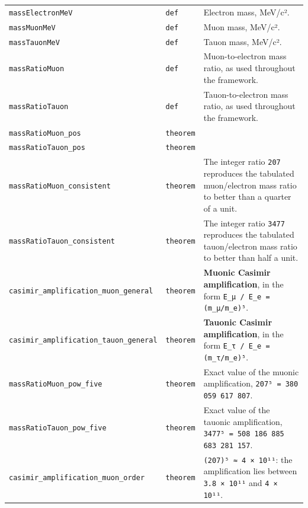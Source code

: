 \documentclass[11pt,a4paper]{article}
\begin{document}
\begin{center}
\begin{longtable}{@{}p{}p{}p{}@{}}
\texttt{massElectronMeV} & \texttt{def} & \small Electron mass, MeV/c². \\
\texttt{massMuonMeV} & \texttt{def} & \small Muon mass, MeV/c². \\
\texttt{massTauonMeV} & \texttt{def} & \small Tauon mass, MeV/c². \\
\texttt{massRatioMuon} & \texttt{def} & \small Muon-to-electron mass ratio, as used throughout the framework. \\
\texttt{massRatioTauon} & \texttt{def} & \small Tauon-to-electron mass ratio, as used throughout the framework. \\
\texttt{massRatioMuon\_\allowbreak{}pos} & \texttt{theorem} & \small  \\
\texttt{massRatioTauon\_\allowbreak{}pos} & \texttt{theorem} & \small  \\
\texttt{massRatioMuon\_\allowbreak{}consistent} & \texttt{theorem} & \small The integer ratio \texttt{207} reproduces the tabulated muon/electron mass ratio to better than a quarter of a unit. \\
\texttt{massRatioTauon\_\allowbreak{}consistent} & \texttt{theorem} & \small The integer ratio \texttt{3477} reproduces the tabulated tauon/electron mass ratio to better than half a unit. \\
\texttt{casimir\_\allowbreak{}amplification\_\allowbreak{}muon\_\allowbreak{}general} & \texttt{theorem} & \small \textbf{Muonic Casimir amplification}, in the form \texttt{E\_\allowbreak{}μ / E\_\allowbreak{}e = (m\_\allowbreak{}μ/m\_\allowbreak{}e)⁵}. \\
\texttt{casimir\_\allowbreak{}amplification\_\allowbreak{}tauon\_\allowbreak{}general} & \texttt{theorem} & \small \textbf{Tauonic Casimir amplification}, in the form \texttt{E\_\allowbreak{}τ / E\_\allowbreak{}e = (m\_\allowbreak{}τ/m\_\allowbreak{}e)⁵}. \\
\texttt{massRatioMuon\_\allowbreak{}pow\_\allowbreak{}five} & \texttt{theorem} & \small Exact value of the muonic amplification, \texttt{207⁵ = 380 059 617 807}. \\
\texttt{massRatioTauon\_\allowbreak{}pow\_\allowbreak{}five} & \texttt{theorem} & \small Exact value of the tauonic amplification, \texttt{3477⁵ = 508 186 885 683 281 157}. \\
\texttt{casimir\_\allowbreak{}amplification\_\allowbreak{}muon\_\allowbreak{}order} & \texttt{theorem} & \small \texttt{(207)⁵ ≈ 4 × 10¹¹}: the amplification lies between \texttt{3.8 × 10¹¹} and \texttt{4 × 10¹¹}. \\

\end{longtable}
\end{center}
\end{document}
